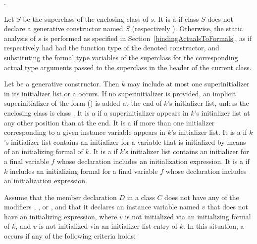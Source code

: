 \documentclass[makeidx]{article}
\begin{document}
\noindent
{}.

\noindent{}%
Let $S$ be the superclass of the enclosing class of $s$.
It is a  if class $S$ does not declare
a generative constructor named $S$ (respectively ).
Otherwise, the static analysis of $s$ is performed
as specified in Section~\ref{bindingActualsToFormals},
as if \code{\SUPER} respectively 
had had the function type of the denoted constructor,
and substituting the formal type variables of the superclass
for the corresponding actual type arguments passed to the superclass
in the header of the current class.

\LMHash{}%
Let  be a generative constructor.
Then $k$ may include at most one superinitializer in its initializer list
or a  occurs.
If no superinitializer is provided,
an implicit superinitializer of the form \SUPER{}() is added
at the end of $k$'s initializer list,
unless the enclosing class is class .
It is a  if a superinitializer appears
in $k$'s initializer list at any other position than at the end.
It is a  if more than one initializer corresponding
to a given instance variable appears in $k$'s initializer list.
It is a  if $k$'s initializer list contains
an initializer for a variable that is initialized by means of
an initializing formal of $k$.
It is a  if $k$'s initializer list contains
an initializer for a final variable $f$ whose declaration includes
an initialization expression.
It is a  if $k$ includes an initializing formal
for a final variable $f$ whose declaration includes
an initialization expression.

\LMHash{}%
%
Assume that the member declaration $D$ in a class $C$
does not have any of the modifiers \LATE, \ABSTRACT, or \EXTERNAL,
and that it declares an instance variable named $v$
that does not have an initializing expression,
where $v$ is not initialized via an initializing formal of $k$,
and $v$ is not initialized via an initializer list entry of $k$.
In this situation,
a  occurs if any of the following criteria holds:
\end{document}
